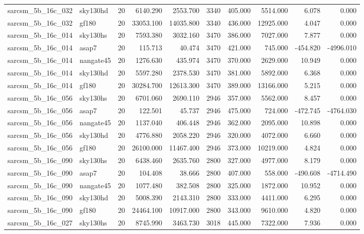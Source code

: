 \begin{longtable}{llrrrrrrrr}
sarcsm\_5b\_16c\_032 & sky130hd & 20 & 6140.290 & 2553.700 & 3340 & 405.000 & 5514.000 & 6.078 & 0.000 \\
sarcsm\_5b\_16c\_032 & gf180 & 20 & 33053.100 & 14035.800 & 3340 & 436.000 & 12925.000 & 4.047 & 0.000 \\
sarcsm\_5b\_16c\_014 & sky130hs & 20 & 7593.380 & 3032.160 & 3470 & 386.000 & 7027.000 & 7.877 & 0.000 \\
sarcsm\_5b\_16c\_014 & asap7 & 20 & 115.713 & 40.474 & 3470 & 421.000 & 745.000 & -454.820 & -4996.010 \\
sarcsm\_5b\_16c\_014 & nangate45 & 20 & 1276.630 & 435.974 & 3470 & 370.000 & 2629.000 & 10.949 & 0.000 \\
sarcsm\_5b\_16c\_014 & sky130hd & 20 & 5597.280 & 2378.530 & 3470 & 381.000 & 5892.000 & 6.368 & 0.000 \\
sarcsm\_5b\_16c\_014 & gf180 & 20 & 30284.700 & 12613.300 & 3470 & 389.000 & 13166.000 & 5.215 & 0.000 \\
sarcsm\_5b\_16c\_056 & sky130hs & 20 & 6701.060 & 2690.110 & 2946 & 357.000 & 5562.000 & 8.457 & 0.000 \\
sarcsm\_5b\_16c\_056 & asap7 & 20 & 122.501 & 45.737 & 2946 & 475.000 & 724.000 & -472.745 & -4764.030 \\
sarcsm\_5b\_16c\_056 & nangate45 & 20 & 1137.040 & 406.448 & 2946 & 362.000 & 2095.000 & 10.898 & 0.000 \\
sarcsm\_5b\_16c\_056 & sky130hd & 20 & 4776.880 & 2058.220 & 2946 & 320.000 & 4072.000 & 6.660 & 0.000 \\
sarcsm\_5b\_16c\_056 & gf180 & 20 & 26100.000 & 11467.400 & 2946 & 373.000 & 10219.000 & 4.824 & 0.000 \\
sarcsm\_5b\_16c\_090 & sky130hs & 20 & 6438.460 & 2635.760 & 2800 & 327.000 & 4977.000 & 8.179 & 0.000 \\
sarcsm\_5b\_16c\_090 & asap7 & 20 & 104.408 & 38.666 & 2800 & 407.000 & 558.000 & -490.608 & -4714.490 \\
sarcsm\_5b\_16c\_090 & nangate45 & 20 & 1077.480 & 382.508 & 2800 & 325.000 & 1872.000 & 10.952 & 0.000 \\
sarcsm\_5b\_16c\_090 & sky130hd & 20 & 5008.390 & 2143.310 & 2800 & 333.000 & 4411.000 & 6.295 & 0.000 \\
sarcsm\_5b\_16c\_090 & gf180 & 20 & 24464.100 & 10917.000 & 2800 & 343.000 & 9610.000 & 4.820 & 0.000 \\
sarcsm\_5b\_16c\_027 & sky130hs & 20 & 8745.990 & 3463.730 & 3018 & 445.000 & 7322.000 & 7.936 & 0.000 \\

\end{longtable}
